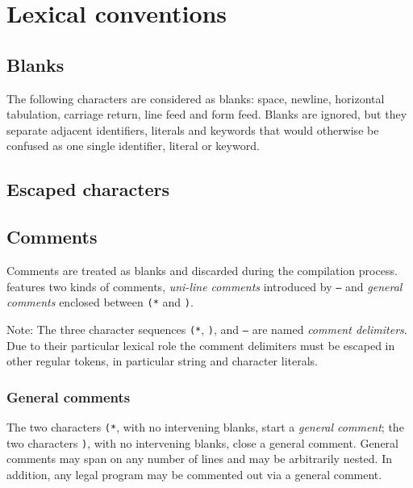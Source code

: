 
\section{Lexical conventions}

\subsection{Blanks}
The following characters are considered as blanks: space, newline,
horizontal tabulation, carriage return, line feed and form
feed. Blanks are ignored, but they separate adjacent identifiers,
literals and keywords that would otherwise be confused as one single
identifier, literal or keyword.

\subsection{Escaped characters}



\subsection{Comments}

Comments are treated as blanks and discarded during the compilation process.
{\focal} features two kinds of comments, {\em uni-line comments} introduced by
{\tt --} and {\em general comments} enclosed between {\tt (*} and {\tt *)}.

Note: The three character sequences {\tt (*}, {\tt *)}, and {\tt --} are
named {\em comment delimiters}.
Due to their particular lexical role the comment delimiters must be escaped in
other regular tokens, in particular string and character literals.

\subsubsection{General comments}

The two characters {\tt (*}, with no intervening blanks, start a {\em
general comment}; the two characters {\tt *)}, with no intervening blanks,
close a general comment. General comments may span on any number of lines and
may be arbitrarily nested. In addition, any legal {\focal} program may be
commented out via a general comment.

